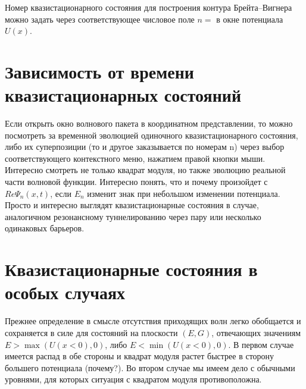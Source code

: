 \documentclass[12pt]{article}
\begin{document}
Номер квазистационарного состояния для построения
контура Брейта--Вигнера  можно задать через соответствующее числовое поле $n=$ в окне потенциала $U(x)$.

\hypertarget{WPquasi}{}\section{Зависимость от времени квазистационарных состояний}
Если открыть окно волнового пакета в координатном представлении, то можно посмотреть за временной
эволюцией одиночного квазистационарного состояния, либо их суперпозиции (то и другое заказывается по номерам n)
через выбор соответствующего контекстного меню, нажатием правой кнопки мыши. Интересно смотреть не только
квадрат модуля, но также эволюцию реальной части волновой функции. Интересно понять, что и почему
произойдет с $Re \Psi_n(x,t)$, если $E_n$ изменит знак при небольшом изменении потенциала.
Просто и интересно выглядят квазистационарные состояния в случае, аналогичном резонансному
туннелированию через пару или несколько одинаковых барьеров.

\hypertarget{Psiquasi}{}\section{Квазистационарные состояния в особых случаях}
Прежнее определение в смысле отсутствия приходящих волн легко обобщается и
сохраняется в силе для состояний на плоскости $(E,G)$, отвечающих значениям $E>\max(U(x<0),0)$, либо $E<\min(U(x<0),0)$.
В первом случае имеется распад в обе стороны и квадрат модуля растет быстрее в сторону большего потенциала
(почему?). Во втором случае мы имеем дело с обычными уровнями, для которых ситуация с квадратом модуля
противоположна.
\end{document}
